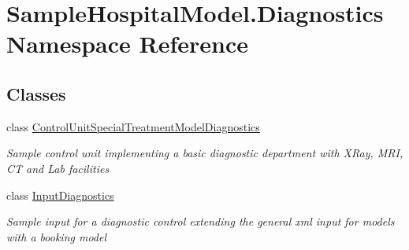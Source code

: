\hypertarget{namespace_sample_hospital_model_1_1_diagnostics}{}\section{Sample\+Hospital\+Model.\+Diagnostics Namespace Reference}
\label{namespace_sample_hospital_model_1_1_diagnostics}
\subsection*{Classes}
\begin{DoxyCompactItemize}
\item 
class \hyperlink{class_sample_hospital_model_1_1_diagnostics_1_1_control_unit_special_treatment_model_diagnostics}{Control\+Unit\+Special\+Treatment\+Model\+Diagnostics}
\begin{DoxyCompactList}\small\item\em Sample control unit implementing a basic diagnostic department with X\+Ray, M\+RI, CT and Lab facilities \end{DoxyCompactList}\item 
class \hyperlink{class_sample_hospital_model_1_1_diagnostics_1_1_input_diagnostics}{Input\+Diagnostics}
\begin{DoxyCompactList}\small\item\em Sample input for a diagnostic control extending the general xml input for models with a booking model \end{DoxyCompactList}\end{DoxyCompactItemize}
